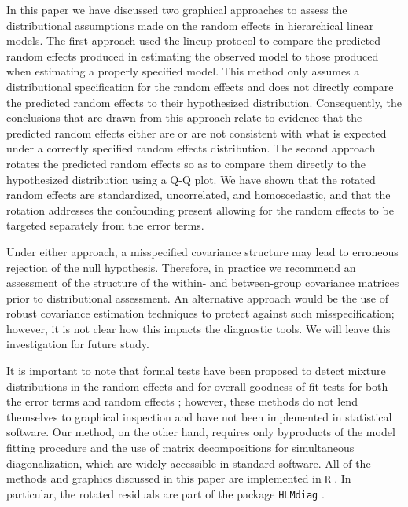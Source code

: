 \documentclass[12pt]{article} %
\newcommand{\al}[1]{{\color{red} #1}}
\begin{document}
In this paper we have discussed two graphical approaches to assess the distributional assumptions made on the random effects in hierarchical linear models. The first approach used the lineup protocol to compare the predicted random effects produced in estimating the observed model to those produced when estimating a properly specified model. This method only assumes a distributional specification for the random effects and does not directly compare the predicted random effects to their hypothesized distribution. Consequently, the conclusions that are drawn from this approach relate to evidence that the predicted random effects either are or are not {consistent} with what is expected under a correctly specified random effects distribution. The second approach rotates the predicted random effects so as to compare them directly to the hypothesized distribution using a Q-Q plot. We have shown that the rotated random effects are standardized, uncorrelated, and homoscedastic, and that the rotation addresses the confounding present allowing for the random effects to be targeted separately from the error terms. 

Under either approach, a misspecified covariance structure may lead to erroneous rejection of the null hypothesis. Therefore, in practice we recommend an assessment of the structure of {the within- and between-group covariance matrices} prior to distributional assessment.
An alternative approach would be the use of robust covariance estimation techniques to protect against such misspecification; however, {it is not clear how this impacts the diagnostic tools. We will leave this investigation for future study.} %

It is important to note that formal tests have been proposed  to detect mixture distributions in the random effects \citep{Verbeke:1996va} and for overall goodness-of-fit tests for both the error terms and random effects \citep{Jiang:2001up}; however, these methods do not lend themselves to graphical inspection and have not been implemented in statistical software. Our method, on the other hand, requires only byproducts of the model fitting procedure and the use of matrix decompositions for simultaneous diagonalization, which are widely accessible in standard software. All of the methods and graphics discussed in this paper are implemented in  \texttt{R} \citep{R}. In particular, the rotated residuals are part of the package \texttt{HLMdiag} \citep{HLMdiag, Loy:JSS}.
\end{document}
